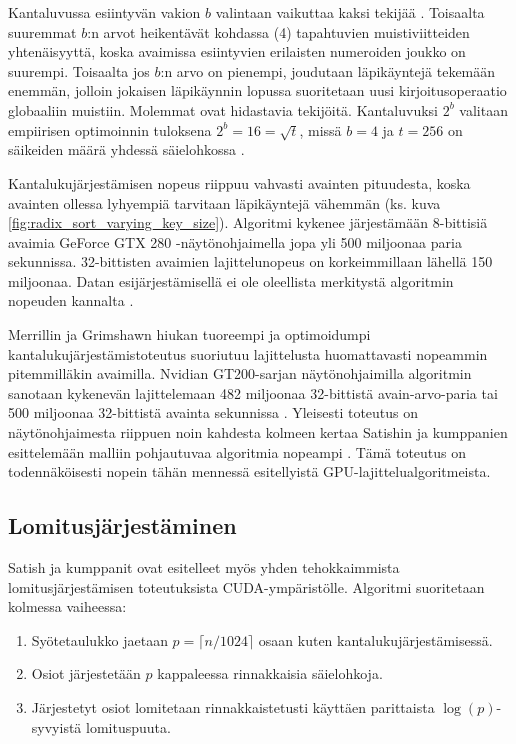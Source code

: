 \documentclass[a4paper,11pt]{article}
\begin{document}
Kantaluvussa esiintyvän vakion $b$ valintaan vaikuttaa kaksi tekijää \cite{satish2009}. Toisaalta suuremmat $b$:n arvot heikentävät kohdassa (4) tapahtuvien muistiviitteiden yhtenäisyyttä, koska avaimissa esiintyvien erilaisten numeroiden joukko on suurempi. Toisaalta jos $b$:n arvo on pienempi, joudutaan läpikäyntejä tekemään enemmän, jolloin jokaisen läpikäynnin lopussa suoritetaan uusi kirjoitusoperaatio globaaliin muistiin. Molemmat ovat hidastavia tekijöitä. Kantaluvuksi $2^b$ valitaan empiirisen optimoinnin tuloksena $2^b = 16 = \sqrt{t}$, missä $b = 4$ ja $t = 256$ on säikeiden määrä yhdessä säielohkossa \cite{satish2009}.

Kantalukujärjestämisen nopeus riippuu vahvasti avainten pituudesta, koska avainten ollessa lyhyempiä tarvitaan läpikäyntejä vähemmän (ks. kuva \ref{fig:radix_sort_varying_key_size}). Algoritmi kykenee järjestämään 8-bittisiä avaimia GeForce GTX 280 -näytönohjaimella jopa yli 500 miljoonaa paria sekunnissa. 32-bittisten avaimien lajittelunopeus on korkeimmillaan lähellä 150 miljoonaa. Datan esijärjestämisellä ei ole oleellista merkitystä algoritmin nopeuden kannalta \cite{satish2009}.

Merrillin ja Grimshawn \cite{merrill2011} hiukan tuoreempi ja optimoidumpi kantalukujärjestämistoteutus suoriutuu lajittelusta huomattavasti nopeammin pitemmilläkin avaimilla. Nvidian GT200-sarjan näytönohjaimilla algoritmin sanotaan kykenevän lajittelemaan 482 miljoonaa 32-bittistä avain-arvo-paria tai 500 miljoonaa 32-bittistä avainta sekunnissa \cite{merrill2010}. Yleisesti toteutus on näytönohjaimesta riippuen noin kahdesta kolmeen kertaa Satishin ja kumppanien esittelemään malliin pohjautuvaa algoritmia nopeampi \cite{merrill2011}. Tämä toteutus on todennäköisesti nopein tähän mennessä esitellyistä GPU-lajittelualgoritmeista.

\subsection{Lomitusjärjestäminen}

Satish ja kumppanit \cite{satish2009} ovat esitelleet myös yhden tehokkaimmista lomitusjärjestämisen toteutuksista CUDA-ympäristölle. Algoritmi suoritetaan kolmessa vaiheessa:

\begin{singlespace*}
\begin{enumerate}
\item Syötetaulukko jaetaan $p = \lceil n/1024 \rceil$ osaan kuten kantalukujärjestämisessä.
\item Osiot järjestetään $p$ kappaleessa rinnakkaisia säielohkoja.
\item Järjestetyt osiot lomitetaan rinnakkaistetusti käyttäen parittaista $\log(p)$-syvyistä lomituspuuta.
\end{enumerate}
\end{singlespace*}
\end{document}
